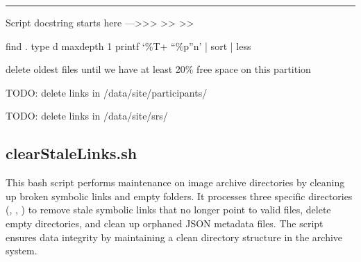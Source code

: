 \documentclass[letterpaper,10pt,english]{sphinxmanual}
\begin{document}
\bigskip\hrule\bigskip


\sphinxAtStartPar
Script docstring starts here —\textgreater{}\textgreater{}\textgreater{}
\textendash{}\textgreater{}\textgreater{}
\textendash{}\textgreater{}\textgreater{}

\sphinxAtStartPar
find . \sphinxhyphen{}type d \sphinxhyphen{}maxdepth 1 \sphinxhyphen{}printf ‘\%T+ “\%p”n’ | sort | less

\sphinxAtStartPar
delete oldest files until we have at least 20\% free space on this partition

\sphinxAtStartPar
TODO: delete links in /data/site/participants/

\sphinxAtStartPar
TODO: delete links in /data/site/srs/

\sphinxstepscope


\subsection{clearStaleLinks.sh}
\label{\detokenize{Architecture/scripts/clearStaleLinks:clearstalelinks-sh}}\label{\detokenize{Architecture/scripts/clearStaleLinks::doc}}
\sphinxAtStartPar
This bash script performs maintenance on image archive directories by cleaning up broken symbolic links and empty folders. It processes three specific directories (, , ) to remove stale symbolic links that no longer point to valid files, delete empty directories, and clean up orphaned JSON metadata files. The script ensures data integrity by maintaining a clean directory structure in the archive system.

\sphinxAtStartPar
{}


\sphinxAtStartPar
{}

\end{document}
